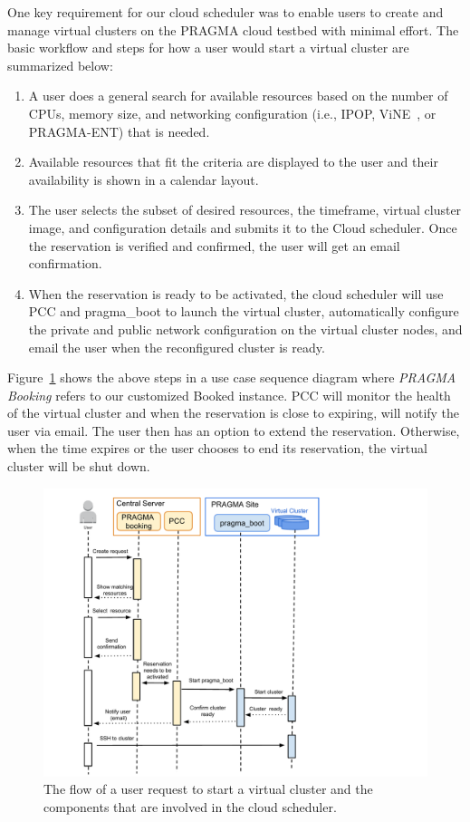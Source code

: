 \documentclass{acm_proc_article-sp}
\begin{document}
One key requirement for our cloud scheduler was to enable users to create and manage virtual clusters on the PRAGMA cloud testbed with minimal effort. 
The basic workflow and steps for how a user would start a virtual cluster are summarized below:

\begin{enumerate}
\item A user does a general search for available resources based on the number of CPUs, memory size, and networking configuration (i.e., IPOP, ViNE~\cite{vine}, or PRAGMA-ENT) that is needed.  
\item Available resources that fit the criteria are displayed to the user and their availability is shown in a calendar layout.  
\item The user selects the subset of  desired resources, the timeframe, virtual cluster image, and configuration details and submits it to the Cloud scheduler.  Once the reservation is verified and confirmed, the user will get an email confirmation.  
\item When the reservation is ready to be activated, the cloud scheduler will use PCC and pragma\_boot to launch the virtual cluster, automatically configure the private and public network configuration on the virtual cluster nodes, and email the user when the reconfigured cluster is ready.   
\end{enumerate}

Figure~\ref{Fig:Flow} shows the above steps in a use case sequence diagram where \textit{PRAGMA Booking} refers to our customized Booked instance.  PCC will monitor the health of the virtual cluster and when the reservation is close to expiring, will notify the user via email. The user then has an option to extend the reservation.  Otherwise, when the time expires or the user chooses to end its reservation, the virtual cluster will be shut down.

\begin{figure}[htbp]
\begin{center}
\includegraphics[width=\columnwidth]{figures/flow.pdf}
\caption{The flow of a user request to start a virtual cluster and the components that are involved in the cloud scheduler.}
\label{Fig:Flow}
\end{center}
\end{figure}
\end{document}

